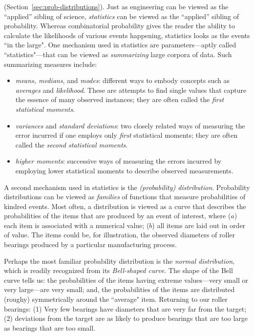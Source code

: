  (Section~\ref{sec:prob-distributions}).
Just as engineering can be viewed as the ``applied'' sibling of science, {\it statistics} can be viewed as the ``applied'' sibling of probability.  Whereas combinatorial probability gives the reader the ability to calculate the likelihoods of various events happening, statistics looks as the events ``in the large".  One mechanism used in statistics are parameters---aptly called ``statistics"---that can be viewed as {\em summarizing} large corpora of data.  Such summarizing measures include:
\begin{itemize}
\item
{\em means, medians}, and {\em modes}: different ways to embody concepts such as {\em averages} and {\em likelihood}.  These are attempts to find single values that capture the essence of many observed instances; they are often called the {\it first statistical moments}.
 
\item
{\em variances} and {\em standard deviations}: two closely related ways of measuring the error incurred if one employs only {\em first} statistical moments; they are often called the {\it second statistical moments}.
\item
{\em higher moments}: successive ways of measuring the errors incurred by employing lower statistical moments to describe observed measurements.
\end{itemize}
A second mechanism used in statistics is the {\em (probability) distribution}.  Probability distributions can be viewed as {\em families} of functions that measure probabilities of kindred events.  Most often, a distribution is viewed as a curve that describes the probabilities of the items that are produced by an event of interest, where ($a$) each item is associated with a numerical value; ($b$) all items are laid out in order of value.  The items could be, for illustration, the observed diameters of roller bearings produced by a particular manufacturing process.

Perhaps the most familiar probability distribution is the {\it normal distribution}, which is readily recognized from its {\it Bell-shaped curve}.  The shape of the Bell curve tells us: the probabilities of the items having extreme values---very small or very large---are very small; and, the probabilities of the items are distributed (roughy) symmetrically around the ``average" item.  Returning to our roller bearings: (1) Very few bearings have diameters that are very far from the target; (2) deviations from the target are as likely to produce bearings that are too large as bearings that are too small.


